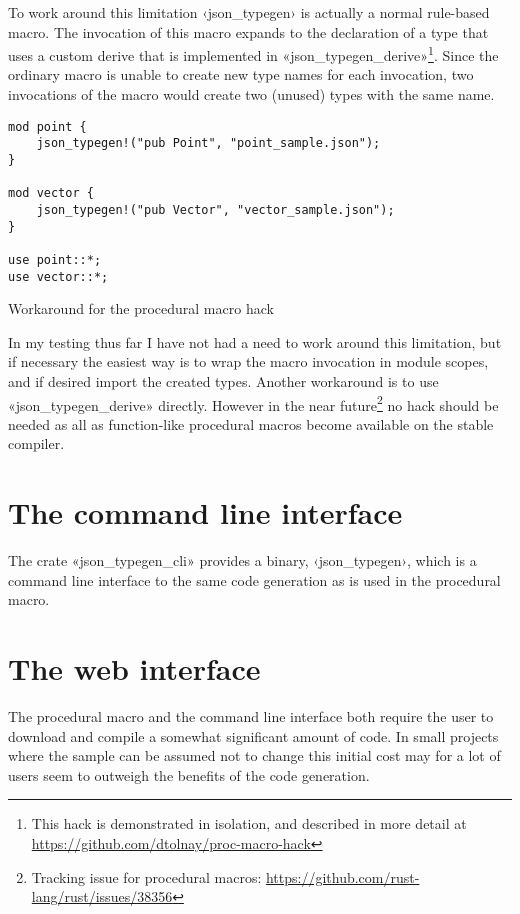 To work around this limitation ‹json_typegen› is actually a normal rule-based macro. The invocation of this macro expands to the declaration of a type that uses a custom derive that is implemented in «json_typegen_derive»\footnote{This hack is demonstrated in isolation, and described in more detail at \url{https://github.com/dtolnay/proc-macro-hack}}. Since the ordinary macro is unable to create new type names for each invocation, two invocations of the macro would create two (unused) types with the same name.

\begin{listing}[ht!]
\begin{verbatim}
mod point {
    json_typegen!("pub Point", "point_sample.json");
}

mod vector {
    json_typegen!("pub Vector", "vector_sample.json");
}

use point::*;
use vector::*;
\end{verbatim}
\caption{Workaround for the procedural macro hack}
\label{lst:hack-workaround}
\end{listing}

In my testing thus far I have not had a need to work around this limitation, but if necessary the easiest way is to wrap the macro invocation in module scopes, and if desired import the created types. Another workaround is to use «json_typegen_derive» directly. However in the near future\footnote{Tracking issue for procedural macros: \url{https://github.com/rust-lang/rust/issues/38356}} no hack should be needed as all as function-like procedural macros become available on the stable compiler.

\section{The command line interface}

The crate «json_typegen_cli» provides a binary, ‹json_typegen›, which is a command line interface to the same code generation as is used in the procedural macro.

\section{The web interface}

The procedural macro and the command line interface both require the user to download and compile a somewhat significant amount of code. In small projects where the sample can be assumed not to change this initial cost may for a lot of users seem to outweigh the benefits of the code generation.

